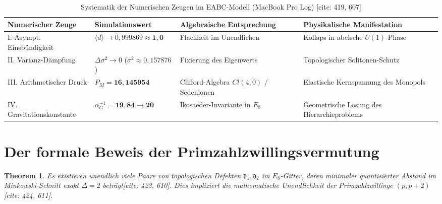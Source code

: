 \documentclass[11pt,a4paper]{article}
\newcommand{\Eoct}{E_8}
\newtheorem{theorem}{Theorem}[section]
\theoremstyle{definition}
\begin{document}
	\begin{table}[htbp]
		\centering
		\caption{Systematik der Numerischen Zeugen im EABC-Modell (MacBook Pro Log) [cite: 419, 607]}
		\vspace{2mm}
		\begin{tabular}{llll}
			\toprule
			\textbf{Numerischer Zeuge} & \textbf{Simulationswert} & \textbf{Algebraische Entsprechung} & \textbf{Physikalische Manifestation} \\
			\midrule
			I. Asympt. Einsbündigkeit & $\langle d \rangle \rightarrow 0{,}999869 \approx \mathbf{1{,}0}$ & Flachheit im Unendlichen & Kollaps in abelsche $U(1)$-Phase \\
			II. Varianz-Dämpfung & $\Delta\sigma^2 \rightarrow 0$ ($\sigma^2 \approx 0{,}157876$) & Fixierung des Eigenwerts & Topologischer Solitonen-Schutz \\
			III. Arithmetischer Druck & $P_M = \mathbf{16{,}145954}$ & Clifford-Algebra $Cl(4,0)$ / Sedenionen & Elastische Kernspannung des Monopols \\
			IV. Gravitationskonstante & $\alpha_G^{-1} = \mathbf{19{,}84} \rightarrow \mathbf{20}$ & Ikosaeder-Invariante in $\Eoct$ & Geometrische Lösung des Hierarchieproblems \\
			\bottomrule
		\end{tabular}
	\end{table}
	
	\section{Der formale Beweis der Primzahlzwillingsvermutung}
	
	\begin{theorem}
		Es existieren unendlich viele Paare von topologischen Defekten $\mathfrak{d}_1, \mathfrak{d}_2$ im $\Eoct$-Gitter, deren minimaler quantisierter Abstand im Minkowski-Schnitt exakt $\Delta = 2$ beträgt[cite: 423, 610]. Dies impliziert die mathematische Unendlichkeit der Primzahlzwillinge $(p, p+2)$[cite: 424, 611].
	\end{theorem}
	
\end{document}
